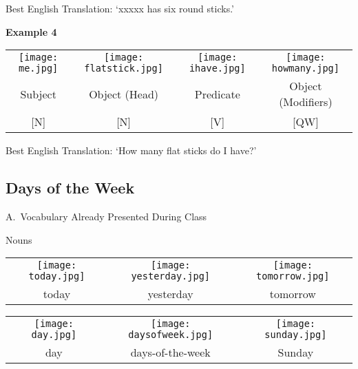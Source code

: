 \documentclass{tufte-book}
\begin{document}
Best English Translation: `xxxxx has six round sticks.'

\vspace{0.25cm}\noindent \textbf{Example 4}
\begin{table*}[h!]
\begin{tabular}{c | c | c | c}
\texttt{[image: me.jpg]}&\texttt{[image: flatstick.jpg]}&\texttt{[image: ihave.jpg]} & \texttt{[image: howmany.jpg]} \\
\footnotesize Subject & \footnotesize Object (Head) & \footnotesize Predicate & \footnotesize Object (Modifiers)  \\
\footnotesize [N] & \footnotesize [N] & \footnotesize [V] &  \footnotesize [QW]\\
\end{tabular}
\end{table*}

Best English Translation: `How many flat sticks do I have?'
\newpage

\subsection{Days of the Week}

\noindent A.~Vocabulary Already Presented During Class

\vspace{0.25cm} \noindent Nouns

\begin{table*}[h!]
\begin{tabular}{c c c}
\texttt{[image: today.jpg]} & \texttt{[image: yesterday.jpg]}& \texttt{[image: tomorrow.jpg]}\\
\footnotesize today & \footnotesize yesterday & \footnotesize tomorrow\\


\end{tabular}
\end{table*}


\begin{table*}[h!]
\begin{tabular}{c c c}
\texttt{[image: day.jpg]} & \texttt{[image: daysofweek.jpg]}& \texttt{[image: sunday.jpg]}\\
\footnotesize day & \footnotesize days-of-the-week & \footnotesize Sunday\\


\end{tabular}
\end{table*}
\end{document}
